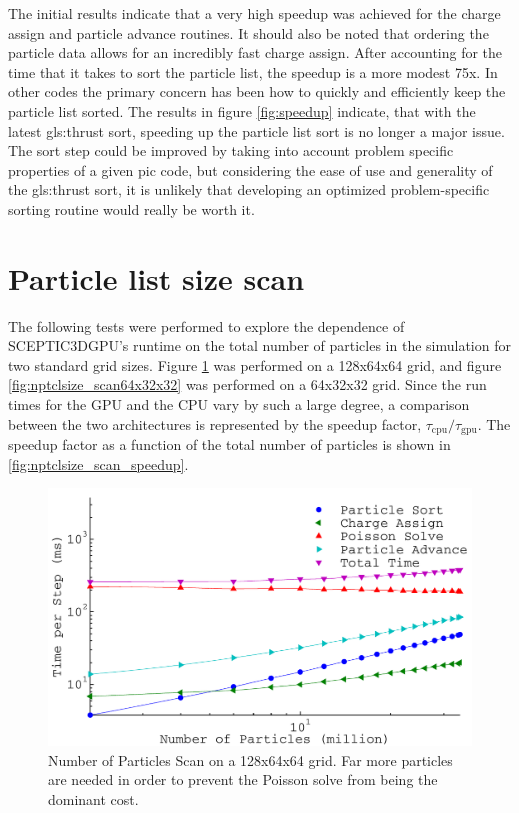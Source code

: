 The initial results indicate that a very high speedup was achieved for the charge assign and particle advance routines. It should also be noted that ordering the particle data allows for an incredibly fast charge assign. After accounting for the time that it takes to sort the particle list, the speedup is a more modest 75x. In other codes the primary concern has been how to quickly and efficiently keep the particle list sorted. The results in figure \ref{fig:speedup} indicate, that with the latest \gls{gls:thrust} sort, speeding up the particle list sort is no longer a major issue. The sort step could be improved by taking into account problem specific properties of a given pic code, but considering the ease of use and generality of the \gls{gls:thrust} sort, it is unlikely that developing an optimized problem-specific sorting routine would really be worth it. 



	
	\section{Particle list size scan}
The following tests were performed to explore the dependence of SCEPTIC3DGPU's runtime on the total number of particles in the simulation for two standard grid sizes. Figure \ref{fig:nptclsize_scan128x64x64} was performed on a 128x64x64 grid, and figure \ref{fig:nptclsize_scan64x32x32} was performed on a 64x32x32 grid. Since the run times for the GPU and the CPU vary by such a large degree, a comparison between the two architectures is represented by the speedup factor, $\tau_{\mathrm{cpu}}/\tau_{\mathrm{gpu}}$. The speedup factor as a function of the total number of particles is shown in \ref{fig:nptclsize_scan_speedup}.

\begin{figure}
\begin{center}
\includegraphics[width=6in]{performance/nptclsize_scan128x64x64ons8bins.pdf}
\end{center}
\caption[Number of Particles Scan on a 128x64x64 grid]{Number of Particles Scan on a 128x64x64 grid. Far more particles are needed in order to prevent the Poisson solve from being the dominant cost.}
\label{fig:nptclsize_scan128x64x64}
\end{figure}

